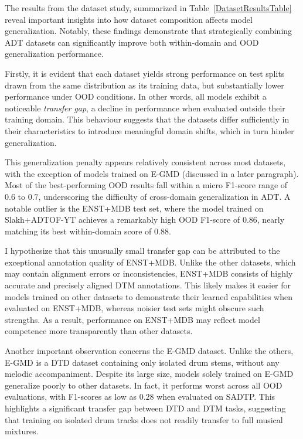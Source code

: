 The results from the dataset study, summarized in Table~\ref{DatasetResultsTable} reveal important insights into how dataset composition affects model generalization. Notably, these findings demonstrate that strategically combining \gls{ADT} datasets can significantly improve both within-domain and \acrfull{OOD} generalization performance.

Firstly, it is evident that each dataset yields strong performance on test splits drawn from the same distribution as its training data, but substantially lower performance under \gls{OOD} conditions. In other words, all models exhibit a noticeable \textit{transfer gap}, a decline in performance when evaluated outside their training domain. This behaviour suggests that the datasets differ sufficiently in their characteristics to introduce meaningful domain shifts, which in turn hinder generalization.

This generalization penalty appears relatively consistent across most datasets, with the exception of models trained on E-GMD (discussed in a later paragraph). Most of the best-performing \gls{OOD} results fall within a micro F1-score range of $0.6$ to $0.7$, underscoring the difficulty of cross-domain generalization in \gls{ADT}. A notable outlier is the ENST+MDB test set, where the model trained on Slakh+ADTOF-YT achieves a remarkably high \gls{OOD} F1-score of $0.86$, nearly matching its best within-domain score of $0.88$. 

I hypothesize that this unusually small transfer gap can be attributed to the exceptional annotation quality of ENST+MDB. Unlike the other datasets, which may contain alignment errors or inconsistencies, ENST+MDB consists of highly accurate and precisely aligned \gls{DTM} annotations. This likely makes it easier for models trained on other datasets to demonstrate their learned capabilities when evaluated on ENST+MDB, whereas noisier test sets might obscure such strengths. As a result, performance on ENST+MDB may reflect model competence more transparently than other datasets.

Another important observation concerns the E-GMD dataset. Unlike the others, E-GMD is a \acrfull{DTD} dataset containing only isolated drum stems, without any melodic accompaniment. Despite its large size, models solely trained on E-GMD generalize poorly to other datasets. In fact, it performs worst across all \gls{OOD} evaluations, with F1-scores as low as $0.28$ when evaluated on SADTP. This highlights a significant transfer gap between \gls{DTD} and \gls{DTM} tasks, suggesting that training on isolated drum tracks does not readily transfer to full musical mixtures. 

